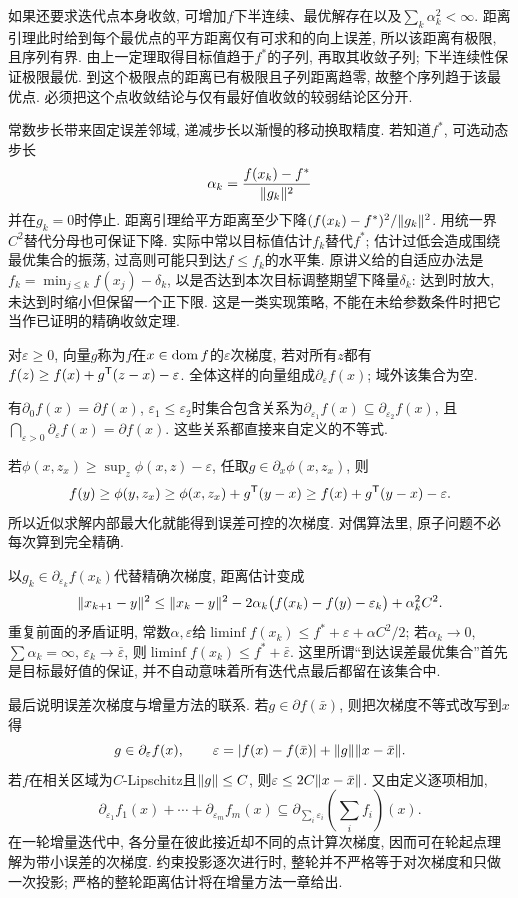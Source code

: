 如果还要求迭代点本身收敛, 可增加$f$下半连续、最优解存在以及$\sum_k\alpha_k^2<\infty$. 距离引理此时给到每个最优点的平方距离仅有可求和的向上误差, 所以该距离有极限, 且序列有界. 由上一定理取得目标值趋于$f^*$的子列, 再取其收敛子列; 下半连续性保证极限最优. 到这个极限点的距离已有极限且子列距离趋零, 故整个序列趋于该最优点. 必须把这个点收敛结论与仅有最好值收敛的较弱结论区分开.

常数步长带来固定误差邻域, 递减步长以渐慢的移动换取精度. 若知道$f^*$, 可选动态步长
\[
 \alpha_k=\frac{f(x_k)-f^*}{\lVert g_k\rVert^2}
\]
并在$g_k=0$时停止. 距离引理给平方距离至少下降$(f(x_k)-f^*)^2/\lVert g_k\rVert^2$. 用统一界$C^2$替代分母也可保证下降. 实际中常以目标值估计$f_k$替代$f^*$; 估计过低会造成围绕最优集合的振荡, 过高则可能只到达$f\le f_k$的水平集. 原讲义给的自适应办法是$f_k=\min_{j\le k}f(x_j)-\delta_k$, 以是否达到本次目标调整期望下降量$\delta_k$: 达到时放大, 未达到时缩小但保留一个正下限. 这是一类实现策略, 不能在未给参数条件时把它当作已证明的精确收敛定理.

\begin{definition}
对$\varepsilon\ge0$, 向量$g$称为$f$在$x\in\operatorname{dom} f$的$\varepsilon$次梯度, 若对所有$z$都有$f(z)\ge f(x)+g^{\mathsf T}(z-x)-\varepsilon$. 全体这样的向量组成$\partial_\varepsilon f(x)$; 域外该集合为空.
\end{definition}
有$\partial_0 f(x)=\partial f(x)$, $\varepsilon_1\le\varepsilon_2$时集合包含关系为$\partial_{\varepsilon_1}f(x)\subseteq\partial_{\varepsilon_2}f(x)$, 且$\bigcap_{\varepsilon>0}\partial_\varepsilon f(x)=\partial f(x)$. 这些关系都直接来自定义的不等式.

若$\phi(x,z_x)\ge\sup_z\phi(x,z)-\varepsilon$, 任取$g\in\partial_x\phi(x,z_x)$, 则
\[
 f(y)\ge\phi(y,z_x)\ge\phi(x,z_x)+g^{\mathsf T}(y-x)
 \ge f(x)+g^{\mathsf T}(y-x)-\varepsilon.
\]
所以近似求解内部最大化就能得到误差可控的次梯度. 对偶算法里, 原子问题不必每次算到完全精确.

以$g_k\in\partial_{\varepsilon_k}f(x_k)$代替精确次梯度, 距离估计变成
\begin{equation}\label{eq:epsilon-distance}
 \lVert x_{k+1}-y\rVert^2\le\lVert x_k-y\rVert^2
 -2\alpha_k\bigl(f(x_k)-f(y)-\varepsilon_k\bigr)+\alpha_k^2 C^2.
\end{equation}
重复前面的矛盾证明, 常数$\alpha,\varepsilon$给$\liminf f(x_k)\le f^*+\varepsilon+\alpha C^2/2$; 若$\alpha_k\to0$, $\sum\alpha_k=\infty$, $\varepsilon_k\to\bar\varepsilon$, 则$\liminf f(x_k)\le f^*+\bar\varepsilon$. 这里所谓“到达误差最优集合”首先是目标最好值的保证, 并不自动意味着所有迭代点最后都留在该集合中.

最后说明误差次梯度与增量方法的联系. 若$g\in\partial f(\bar x)$, 则把次梯度不等式改写到$x$得
\[
 g\in\partial_\varepsilon f(x),\qquad
 \varepsilon=|f(x)-f(\bar x)|+\lVert g\rVert\lVert x-\bar x\rVert.
\]
若$f$在相关区域为$C$-Lipschitz且$\lVert g\rVert\le C$, 则$\varepsilon\le2C\lVert x-\bar x\rVert$. 又由定义逐项相加,
\[
 \partial_{\varepsilon_1}f_1(x)+\cdots+\partial_{\varepsilon_m}f_m(x)
 \subseteq\partial_{\sum_i\varepsilon_i}\left(\sum_i f_i\right)(x).
\]
在一轮增量迭代中, 各分量在彼此接近却不同的点计算次梯度, 因而可在轮起点理解为带小误差的次梯度. 约束投影逐次进行时, 整轮并不严格等于对次梯度和只做一次投影; 严格的整轮距离估计将在增量方法一章给出.
